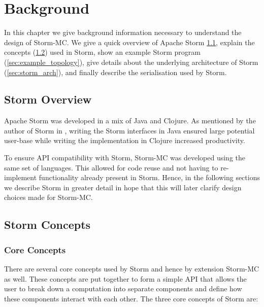\documentclass[bsc,logo,frontabs,twoside,singlespacing,normalheadings,parskip]{infthesis}\usepackage[]{graphicx}\usepackage[]{color}
\begin{document}
\clearpage{}\chapter{Background}

In this chapter we give background information necessary to understand the design of Storm-MC. We give a quick overview of Apache Storm \ref{sec:storm_overview}, explain the concepts (\ref{sec:concepts}) used in Storm, show an example Storm program (\ref{sec:example_topology}), give details about the underlying architecture of Storm (\ref{sec:storm_arch}), and finally  describe the serialisation used by Storm.

\section{Storm Overview}
\label{sec:storm_overview}

Apache Storm was developed in a mix of Java and Clojure. As mentioned by the author of Storm in \cite{Marz_2014}, writing the Storm interfaces in Java ensured large potential user-base while writing the implementation in Clojure increased productivity.

To ensure API compatibility with Storm, Storm-MC was developed using the same set of languages. This allowed for code reuse and not having to re-implement functionality already present in Storm. Hence, in the following sections we describe Storm in greater detail in hope that this will later clarify design choices made for Storm-MC.

\section{Storm Concepts}
\label{sec:concepts}

\subsection{Core Concepts}

There are several core concepts used by Storm and hence by extension Storm-MC as well. These concepts are put together to form a simple API that allows the user to break down a computation into separate components and define how these components interact with each other. The three core concepts of Storm are:
\end{document}
